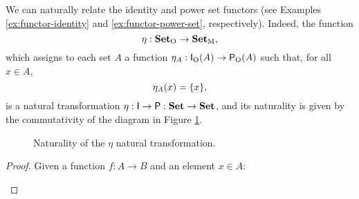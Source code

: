 \begin{example}
  \label{ex:natural-identity-power-set}


  We can naturally relate the identity and power set functors (see
  Examples \ref{ex:functor-identity} and \ref{ex:functor-power-set},
  respectively). Indeed, the function
  \begin{equation*}
    \eta: \mathcal{\mathbf{Set}}_{\operatorname{O}} \to \mathcal{\mathbf{Set}}_{\operatorname{M}}
    \text{,}
  \end{equation*}
  which assigns to each set $A$ a function $\eta_{A}:
  \mathsf{I}_{\operatorname{O}}(A) \to \mathsf{P}_{\operatorname{O}}(A)$ such that, for all $x \in A$,
  \begin{equation}
    \label{eq:eta}
    \eta_{A}(x) = \{x\}
    \text{,}
  \end{equation}
  is a natural transformation $\eta: \mathsf{I} \to \mathsf{P}: \mathbf{Set}
  \to \mathbf{Set}$, and its naturality is given by the commutativity of the
  diagram in Figure \ref{fig:naturality-identity-power-set}.

  \begin{figure}[htb]
    \begin{center}
    \end{center}
    \caption{Naturality of the $\eta$ natural transformation.}
    \label{fig:naturality-identity-power-set}
  \end{figure}

  \begin{proof}

    Given a function $f: A \to B$ and an element $x \in A$:
    \begin{steps}
        \eqby{\eqref{eq:functor-identity-morphism}}
        \eqby{\eqref{eq:eta}}
    \end{steps}

  \end{proof}

\end{example}

